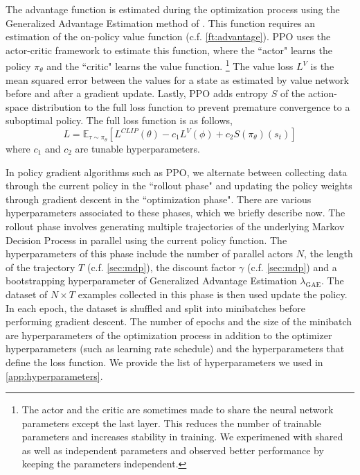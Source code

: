 The advantage function is estimated during the optimization process using the Generalized Advantage Estimation method of 
\cite{schulman2018highdimensional}. 
This function requires an estimation of the on-policy value function (c.f. \autoref{ft:advantage}). PPO uses the actor-critic framework to estimate this function, where the ``actor" learns the policy $\pi_\theta$ and the ``critic" learns the value function.
\footnote{
The actor and the critic are sometimes made to share the neural network parameters except the last layer. This reduces the number of trainable parameters and increases stability in training. We experimened with shared as well as independent parameters and observed better performance by keeping the parameters independent.
}
The value loss $L^V$ is the mean squared error between the values for a state as estimated by value network before and after a gradient update.
Lastly, PPO adds entropy $S$ of the action-space distribution to the full loss function to prevent premature convergence to a suboptimal policy. The full loss function is as follows,
\[
L = \mathbb{E}_{\tau \sim \pi_\theta} [L^{CLIP}(\theta) - c_1 L^{V}(\phi) + c_2 S(\pi_\theta)(s_t)]
\]
where $c_1$ and $c_2$ are tunable hyperparameters.
\newline 

In policy gradient algorithms such as PPO, we alternate between collecting data through the current policy in the ``rollout phase" and updating the policy weights through gradient descent in the ``optimization phase". There are various hyperparameters associated to these phases, which we briefly describe now. The rollout phase involves generating multiple trajectories of the underlying Markov Decision Process in parallel using the current policy function. The hyperparameters of this phase include the number of parallel actors $N$, the length of the trajectory $T$ (c.f. \autoref{sec:mdp}), the discount factor $\gamma$ (c.f. \autoref{sec:mdp}) and a bootstrapping hyperparameter of Generalized Advantage Estimation $\lambda_{\text{GAE}}$. The dataset of $N \times T$ examples collected in this phase is then used update the policy. In each epoch, the dataset is shuffled and split into minibatches before performing gradient descent. The number of epochs and the size of the minibatch are hyperparameters of the optimization process in addition to the optimizer hyperparameters (such as learning rate schedule) and the hyperparameters that define the loss function. We provide the list of hyperparameters we used in  \autoref{app:hyperparameters}.


